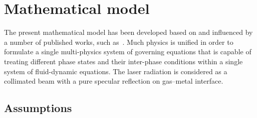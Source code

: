 \documentclass[final]{elsarticle} %
\begin{document}
\section{Mathematical model}\label{sec:model}

The present mathematical model has been developed based on and influenced by a number of
published works, such as~\cite{cho2006implementation, attar2011simulation, qiu2015role, khairallah2016laser,
wang2019powder, cook2019simulation, khairallah2020controlling}.
Much physics is unified in order to formulate a single multi-physics system of governing equations
that is capable of treating different phase states and their inter-phase conditions
within a single system of fluid-dynamic equations.
The laser radiation is considered as a collimated beam with a pure specular reflection on gas--metal interface.

\subsection{Assumptions}
\end{document}
